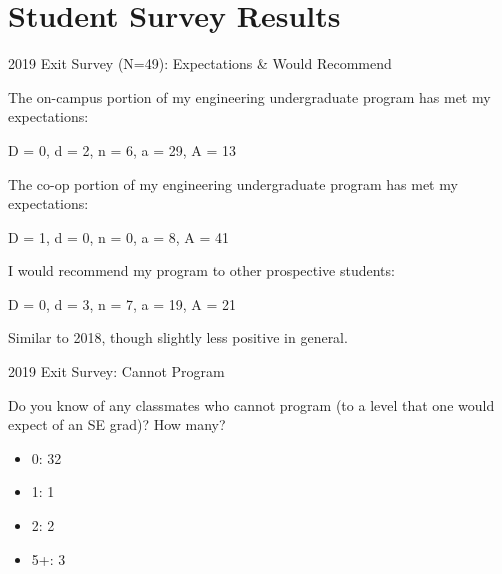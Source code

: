 \documentclass{beamer}
\newenvironment{changemargin}[1]{%
  \begin{list}{}{%
    \setlength{\topsep}{0pt}%
    \setlength{\leftmargin}{#1}%
    \setlength{\rightmargin}{1em}
    \setlength{\listparindent}{\parindent}%
    \setlength{\itemindent}{\parindent}%
    \setlength{\parsep}{\parskip}%
  }%
  \item[]}{\end{list}}
\begin{document}
\part{Student Survey Results}
\frame{\partpage}
\begin{frame}{2019 Exit Survey (N=49): Expectations \& Would Recommend}
  \begin{changemargin}{1cm}
    The on-campus portion of my engineering undergraduate program has met my expectations:\\
    \begin{center}
      D = 0, d = 2, n = 6, a = 29, A = 13\\[1em]
    \end{center}
  
  The co-op portion of my engineering undergraduate program has met my expectations:\\
    \begin{center}
      D = 1, d = 0, n = 0, a = 8, A = 41\\[1em]
    \end{center}

  I would recommend my program to other prospective students:\\
    \begin{center}
      D = 0, d = 3, n = 7, a = 19, A = 21\\[1em]
    \end{center}

  Similar to 2018, though slightly less positive in general.
  \end{changemargin}
\end{frame}

\begin{frame}{2019 Exit Survey: Cannot Program}
  \begin{changemargin}{1cm}
    Do you know of any classmates who cannot program (to a level that one would expect of an SE grad)? How many?
    \begin{itemize}
    \item 0: 32
    \item 1: 1
    \item 2: 2
    \item 5+: 3
    \end{itemize}
  \end{changemargin}
\end{frame}
\end{document}
